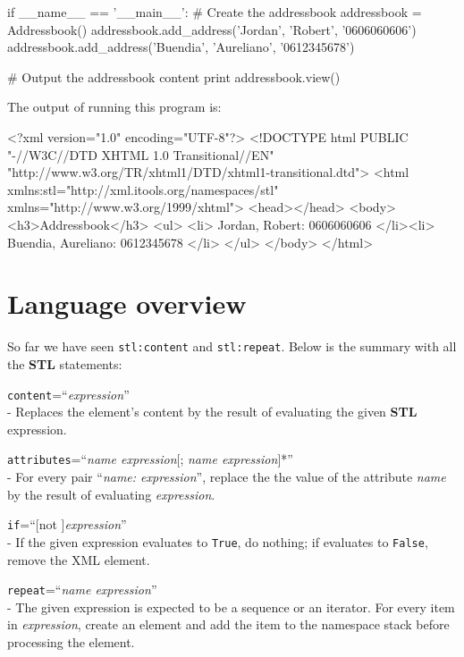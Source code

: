 \begin{code}
    if __name__ == '__main__':
        # Create the addressbook
        addressbook = Addressbook()
        addressbook.add_address('Jordan', 'Robert', '0606060606')
        addressbook.add_address('Buendia', 'Aureliano', '0612345678')

        # Output the addressbook content
        print addressbook.view()
\end{code}

The output of running this program is:

\begin{code}
    <?xml version="1.0" encoding="UTF-8"?>
    <!DOCTYPE html
         PUBLIC "-//W3C//DTD XHTML 1.0 Transitional//EN"
        "http://www.w3.org/TR/xhtml1/DTD/xhtml1-transitional.dtd">
    <html xmlns:stl="http://xml.itools.org/namespaces/stl"
          xmlns="http://www.w3.org/1999/xhtml">
      <head></head>
      <body>
        <h3>Addressbook</h3>
        <ul>
          <li>
            Jordan,
            Robert:
            0606060606
          </li><li>
            Buendia,
            Aureliano:
            0612345678
          </li>
        </ul>
      </body>
    </html>
\end{code}


\section{Language overview}

So far we have seen {\tt stl:content} and {\tt stl:repeat}. Below is the
summary with all the {\bf STL} statements:

\begin{api}
    {\tt content}=``{\em expression}''\\
    - Replaces the element's content by the result of evaluating the given
    {\bf STL} expression.

    {\tt attributes}=``{\em name expression}[; {\em name expression}]*''\\
    - For every pair ``{\em name: expression}'', replace the the value of
    the attribute {\em name} by the result of evaluating {\em expression}.

    {\tt if}=``[not ]{\em expression}''\\
    - If the given expression evaluates to {\tt True}, do nothing; if
    evaluates to {\tt False}, remove the XML element.

    {\tt repeat}=``{\em name expression}''\\
    - The given expression is expected to be a sequence or an iterator.
    For every item in {\em expression}, create an element and add the
    item to the namespace stack before processing the element.
\end{api}


